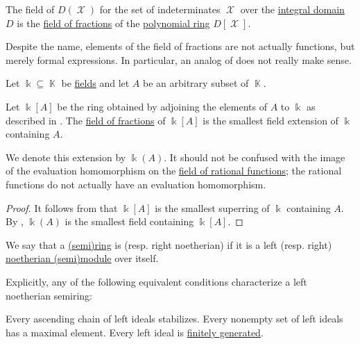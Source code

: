 \begin{definition}\label{def:rational_function_field}
  The field of  \( D(\mscrX) \) for the set of indeterminates \( \mscrX \) over the \hyperref[def:integral_domain]{integral domain} \( D \) is the \hyperref[thm:field_of_fractions]{field of fractions} of the \hyperref[def:polynomial_semiring]{polynomial ring} \( D[\mscrX] \).

  Despite the name, elements of the field of fractions are not actually functions, but merely formal expressions. In particular, an analog of  does not really make sense.
\end{definition}

\begin{proposition}\label{thm:adjoining_elements_to_field}
  Let \( \Bbbk \subseteq \BbbK \) be \hyperref[def:field]{fields} and let \( A \) be an arbitrary subset of \( \BbbK \).

  Let \( \Bbbk[A] \) be the ring obtained by adjoining the elements of \( A \) to \( \Bbbk \) as described in . The \hyperref[def:field_of_fractions]{field of fractions} of \( \Bbbk[A] \) is the smallest field extension of \( \Bbbk \) containing \( A \).

  We denote this extension by \( \Bbbk(A) \). It should not be confused with the image of the evaluation homomorphism on the \hyperref[def:rational_function_field]{field of rational functions}; the rational functions do not actually have an evaluation homomorphism.
\end{proposition}
\begin{proof}
  It follows from  that \( \Bbbk[A] \) is the smallest superring of \( \Bbbk \) containing \( A \). By , \( \Bbbk(A) \) is the smallest field containing \( \Bbbk[A] \).
\end{proof}

\begin{definition}\label{def:noetherian_semiring}
  We say that a \hyperref[def:semiring]{(semi)ring} is  (resp. right noetherian) if it is a left (resp. right) \hyperref[def:noetherian_semimodule]{noetherian (semi)module} over itself.

  Explicitly, any of the following equivalent conditions characterize a left noetherian semiring:
  \begin{thmenum}
     Every ascending chain of left ideals stabilizes.
     Every nonempty set of left ideals has a maximal element.
     Every left ideal is \hyperref[def:semiring_ideal/generated]{finitely generated}.
  \end{thmenum}
\end{definition}

